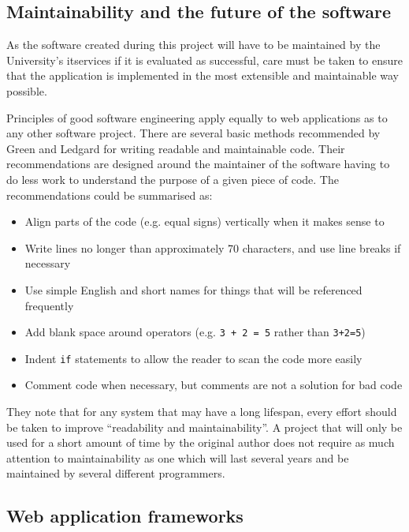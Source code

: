 \documentclass[draft]{scrartcl}
\begin{document}
\subsection{Maintainability and the future of the software}
\label{sec:maintainability}

As the software created during this project will have to be maintained by the
University's \gls{itservices} if it is evaluated as successful, care must be
taken to ensure that the application is implemented in the most extensible and
maintainable way possible.

Principles of good software engineering apply equally to web applications as
to any other software project. There are several basic methods recommended by
Green and Ledgard \cite{Green:2011:CGF:2063166.2063168} for writing readable
and maintainable code. Their recommendations are designed around the
maintainer of the software having to do less work to understand the purpose of
a given piece of code. The recommendations could be summarised as:

\begin{itemize}
  \item Align parts of the code (e.g. equal signs) vertically when it makes sense to
  \item Write lines no longer than approximately 70 characters, and use line breaks if necessary
  \item Use simple English and short names for things that will be referenced frequently
  \item Add blank space around operators (e.g. \texttt{3 + 2 = 5} rather than \texttt{3+2=5})
  \item Indent \texttt{if} statements to allow the reader to scan the code more easily
  \item Comment code when necessary, but comments are not a solution for bad code
\end{itemize}

They note that for any system that may have a long lifespan, every effort
should be taken to improve ``readability and maintainability''. A project that
will only be used for a short amount of time by the original author does not
require as much attention to maintainability as one which will last several
years and be maintained by several different programmers.

\subsection{Web application frameworks}
\end{document}
